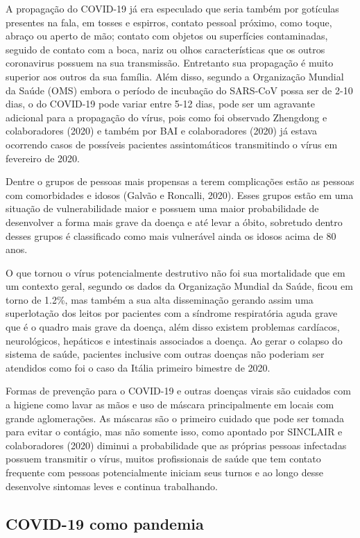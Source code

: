 A propagação do COVID-19 já era especulado que seria também por gotículas presentes na fala, em tosses e espirros, contato pessoal próximo, como toque, abraço ou aperto de mão; contato com objetos ou superfícies contaminadas, seguido de contato com a boca, nariz ou olhos características que os outros coronavirus possuem na sua transmissão. Entretanto sua propagação é muito superior aos outros da sua família. Além disso, segundo a Organização Mundial da Saúde (OMS) embora o período de incubação do SARS-CoV possa ser de 2-10 dias, o do COVID-19 pode variar entre 5-12 dias, pode ser um agravante adicional para a propagação do vírus, pois como foi observado Zhengdong e colaboradores (2020) e também por BAI e colaboradores (2020) já estava ocorrendo casos de possíveis pacientes assintomáticos transmitindo o vírus em fevereiro de 2020.

Dentre o grupos de pessoas mais propensas a terem complicações estão as pessoas com comorbidades e idosos (Galvão e Roncalli, 2020). Esses grupos estão em uma situação de vulnerabilidade maior e possuem uma maior probabilidade de desenvolver a forma mais grave da doença e até levar a óbito, sobretudo dentro desses grupos é classificado como mais vulnerável ainda os idosos acima de 80 anos.

O que tornou o vírus potencialmente destrutivo não foi sua mortalidade que em um contexto geral, segundo os dados da Organização Mundial da Saúde, ficou em torno de 1.2\%, mas também a sua alta disseminação gerando assim uma superlotação dos leitos por pacientes com a síndrome respiratória aguda grave que é o quadro mais grave da doença, além disso existem problemas cardíacos, neurológicos, hepáticos e intestinais associados a doença. Ao gerar o colapso do sistema de saúde, pacientes inclusive com outras doenças não poderiam ser atendidos como foi o caso da Itália primeiro bimestre de 2020.

Formas de prevenção para o COVID-19 e outras doenças virais são cuidados com a higiene como lavar as mãos e uso de máscara principalmente em locais com grande aglomerações. As máscaras são o primeiro cuidado que pode ser tomada para evitar o contágio, mas não somente isso, como apontado por SINCLAIR e colaboradores (2020) diminui a probabilidade que as próprias pessoas infectadas possuem transmitir o vírus, muitos profissionais de saúde que tem contato frequente com pessoas potencialmente iniciam seus turnos e ao longo desse desenvolve sintomas leves e continua trabalhando.    

\subsection{COVID-19 como pandemia}

